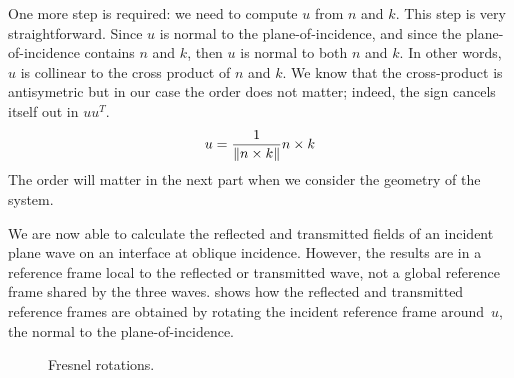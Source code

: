 One more step is required: we need to compute $u$ from $n$ and $k$.
This step is very straightforward.
Since $u$ is normal to the plane-of-incidence, and since the plane-of-incidence contains $n$ and $k$, then $u$ is normal to both $n$ and $k$.
In other words, $u$ is collinear to the cross product of $n$ and $k$.
We know that the cross-product is antisymetric but in our case the order does not matter; indeed, the sign cancels itself out in $u u^T$.
\begin{equation}
    u = \frac{1}{\left\| n \times k \right\|} n \times k
\end{equation}
The order will matter in the next part when we consider the geometry of the system.

We are now able to calculate the reflected and transmitted fields of an incident plane wave on an interface at oblique incidence.
However, the results are in a reference frame local to the reflected or transmitted wave, not a global reference frame shared by the three waves.
 shows how the reflected and transmitted reference frames are obtained by rotating the incident reference frame around~$u$, the normal to the plane-of-incidence.
\begin{figure}[hbtp]
    \centering
    \caption{\label{fig:fresnel_rotations}Fresnel rotations.}
\end{figure}

